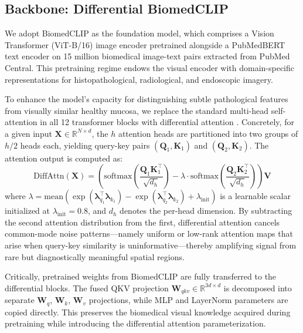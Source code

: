 \documentclass[12pt]{article}
\begin{document}
\subsection{Backbone: Differential BiomedCLIP}

We adopt BiomedCLIP \cite{Zhang2023biomedclip} as the foundation model, which comprises a Vision Transformer (ViT-B/16) image encoder pretrained alongside a PubMedBERT \cite{Gu2022pubmedbert} text encoder on 15 million biomedical image-text pairs extracted from PubMed Central. This pretraining regime endows the visual encoder with domain-specific representations for histopathological, radiological, and endoscopic imagery.

To enhance the model's capacity for distinguishing subtle pathological features from visually similar healthy mucosa, we replace the standard multi-head self-attention in all 12 transformer blocks with differential attention \cite{Ye2024difftransformer}. Concretely, for a given input $\mathbf{X} \in \mathbb{R}^{N \times d}$, the $h$ attention heads are partitioned into two groups of $h/2$ heads each, yielding query-key pairs $(\mathbf{Q}_1, \mathbf{K}_1)$ and $(\mathbf{Q}_2, \mathbf{K}_2)$. The attention output is computed as:
\begin{equation}
    \text{DiffAttn}(\mathbf{X}) = \left(\text{softmax}\left(\frac{\mathbf{Q}_1\mathbf{K}_1^\top}{\sqrt{d_h}}\right) - \lambda \cdot \text{softmax}\left(\frac{\mathbf{Q}_2\mathbf{K}_2^\top}{\sqrt{d_h}}\right)\right)\mathbf{V}
\end{equation}
where $\lambda = \text{mean}(\exp(\boldsymbol{\lambda}_{q_1}^\top \boldsymbol{\lambda}_{k_1}) - \exp(\boldsymbol{\lambda}_{q_2}^\top \boldsymbol{\lambda}_{k_2}) + \lambda_{\text{init}})$ is a learnable scalar initialized at $\lambda_{\text{init}} = 0.8$, and $d_h$ denotes the per-head dimension. By subtracting the second attention distribution from the first, differential attention cancels common-mode noise patterns—namely uniform or low-rank attention maps that arise when query-key similarity is uninformative—thereby amplifying signal from rare but diagnostically meaningful spatial regions.

Critically, pretrained weights from BiomedCLIP are fully transferred to the differential blocks. The fused QKV projection $\mathbf{W}_{qkv} \in \mathbb{R}^{3d \times d}$ is decomposed into separate $\mathbf{W}_q$, $\mathbf{W}_k$, $\mathbf{W}_v$ projections, while MLP and LayerNorm parameters are copied directly. This preserves the biomedical visual knowledge acquired during pretraining while introducing the differential attention parameterization.
\end{document}
